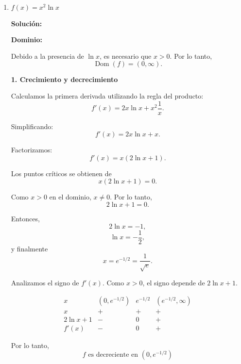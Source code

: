 \documentclass[12pt]{article}
\newcommand{\solucion}{%
    \vspace{0.8em}%
    \textbf{Solución:}%
}
\begin{document}
\begin{enumerate}[label=\roman*.-]
    Para $x=0$:
    \[
    f(0)=0.
    \]

    Para $x=\sqrt3$:
    \[
    f(\sqrt3)
    =
    \frac{\sqrt3}{3+1}
    =
    \frac{\sqrt3}{4}.
    \]

    Por lo tanto, los puntos de inflexión son

    \[
    \boxed{
    \left(-\sqrt3,-\frac{\sqrt3}{4}\right),
    \quad
    (0,0),
    \quad
    \left(\sqrt3,\frac{\sqrt3}{4}\right)
    }.
    \]

    \vspace{1cm}

				\newpage
    \setcounter{enumi}{3} %

    \item $f(x) = x^2\ln x$

    \solucion

    \textbf{Dominio:}

    Debido a la presencia de $\ln x$, es necesario que $x>0$.
    Por lo tanto,
    \[
    \operatorname{Dom}(f)=(0,\infty).
    \]

    \textbf{1. Crecimiento y decrecimiento}

    Calculamos la primera derivada utilizando la regla del producto:
    \[
    f'(x)
    =
    2x\ln x+x^2\frac{1}{x}.
    \]

    Simplificando:
    \[
    f'(x)=2x\ln x+x.
    \]

    Factorizamos:
    \[
    f'(x)=x(2\ln x+1).
    \]

    Los puntos críticos se obtienen de
    \[
    x(2\ln x+1)=0.
    \]

    Como $x>0$ en el dominio, $x\neq0$. Por lo tanto,
    \[
    2\ln x+1=0.
    \]

    Entonces,
    \[
    2\ln x=-1,
    \]
    \[
    \ln x=-\frac12,
    \]
    y finalmente
    \[
    x=e^{-1/2}=\frac{1}{\sqrt e}.
    \]

    Analizamos el signo de $f'(x)$. Como $x>0$, el signo depende de
    $2\ln x+1$.

    \[
    \begin{array}{c|ccc}
    x & (0,e^{-1/2}) & e^{-1/2} & (e^{-1/2},\infty)\\
    \hline
    x & + & + & +\\
    2\ln x+1 & - & 0 & +\\
    \hline
    f'(x) & - & 0 & +
    \end{array}
    \]

    Por lo tanto,
    \[
    \boxed{
    f \text{ es decreciente en }
    (0,e^{-1/2})
    }
    \]


\end{enumerate}
\end{document}
